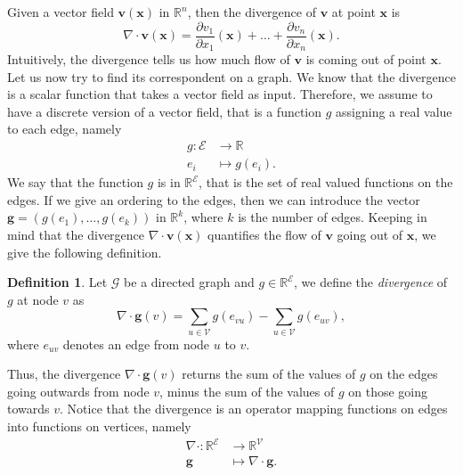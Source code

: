 \documentclass[12pt,a4paper]{report}
\theoremstyle{definition}
\newtheorem{definition}{Definition}[chapter]
\begin{document}
Given a vector field $\mathbf{v}(\mathbf{x})$ in $\mathbb{R}^n$, then the divergence of $\mathbf{v}$ at point $\mathbf{x}$ is
\begin{equation*}
    \nabla \cdot \mathbf{v}(\mathbf{x}) = \frac{\partial v_1}{\partial x_1}(\mathbf{x}) + \ldots + \frac{\partial v_n}{\partial x_n}(\mathbf{x}) .
\end{equation*}
Intuitively, the divergence tells us how much flow of $\mathbf{v}$ is coming out of point $\mathbf{x}$.
Let us now try to find its correspondent on a graph.
We know that the divergence is a scalar function that takes a vector field as input.
Therefore, we assume to have a discrete version of a vector field, that is a function $g$ assigning a real value to each edge, namely
\begin{align*}
    g \colon \mathcal{E} & \longrightarrow \mathbb{R} \\
    e_i & \longmapsto g(e_i) .
\end{align*}
We say that the function $g$ is in $\mathbb{R}^{\mathcal{E}}$, that is the set of real valued functions on the edges.
If we give an ordering to the edges, then we can introduce the vector $\textbf{g} = \left( g(e_1) , \ldots , g(e_k) \right)$ in $\mathbb{R}^{k}$, where $k$ is the number of edges. 
Keeping in mind that the divergence $\nabla \cdot \mathbf{v}(\mathbf{x})$ quantifies the flow of $\mathbf{v}$ going out of $\mathbf{x}$, we give the following definition.
\begin{definition}
Let $\mathcal{G}$ be a directed graph and $g \in \mathbb{R}^{\mathcal{E}}$, we define the \emph{divergence} of $g$ at node $v$ as
\begin{equation*}
    \nabla \cdot \mathbf{g}(v) = \sum_{u \in \mathcal{V}} g(e_{vu}) - \sum_{u \in \mathcal{V}} g(e_{uv}) ,
\end{equation*}
where $e_{uv}$ denotes an edge from node $u$ to $v$.
\end{definition}

Thus, the divergence $\nabla \cdot \mathbf{g}(v)$ returns the sum of the values of $g$ on the edges going outwards from node $v$, minus the sum of the values of $g$ on those going towards $v$.
Notice that the divergence is an operator mapping functions on edges into functions on vertices, namely
\begin{align*}
    \nabla \cdot \colon \mathbb{R}^{\mathcal{E}} & \longrightarrow \mathbb{R}^{\mathcal{V}} \\
    \textbf{g} & \longmapsto \nabla \cdot \textbf{g} .
\end{align*}
\end{document}
